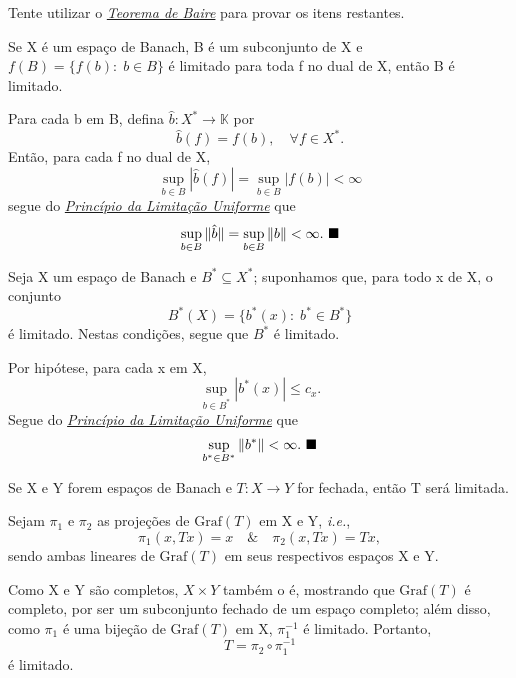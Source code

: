 \documentclass[../functional_analysis.tex]{subfiles}
\begin{document}
\begin{exr}
	Tente utilizar o \hyperlink{baire_theorem}{\textit{Teorema de Baire}} para provar os itens restantes.
\end{exr}
\begin{crl*}
	Se X é um espaço de Banach, B é um subconjunto de X e \(f(B)=\{f(b):\; b\in B\}\) é limitado para toda f no dual de X, então B é limitado.
\end{crl*}
\begin{proof*}
	Para cada b em B, defina \(\hat{b}:X^{*}\rightarrow \mathbb{K}\) por
	\[
		\hat{b}(f)=f(b),\quad \forall f\in X^{*}.
	\]
	Então, para cada f no dual de X,
	\[
		\sup_{b\in B}| \hat{b}(f) | = \sup_{b\in B}| f(b) | < \infty
	\]
	segue do \hyperlink{uniform_limitation}{\textit{Princípio da Limitação Uniforme}} que
	\[
		\sup_{b\in B} \Vert \hat{b} \Vert = \sup_{b\in B}\Vert b \Vert < \infty. \text{ $\blacksquare$}
	\]
\end{proof*}
\begin{crl*}
	Seja X um espaço de Banach e \(B^{*}\subseteq X^{*}\); suponhamos que, para todo x de X, o conjunto
	\[
		B^{*}(X)=\{b^{*}(x):\; b^{*}\in B^{*}\}
	\]
	é limitado. Nestas condições, segue que \(B^{*}\) é limitado.
\end{crl*}
\begin{proof*}
	Por hipótese, para cada x em X,
	\[
		\sup_{b\in B^{*}} | b^{*}(x) | \leq c_{x}.
	\]
	Segue do \hyperlink{uniform_limitation}{\textit{Princípio da Limitação Uniforme}} que
	\[
		\sup_{b^{*}\in B^{*}}\Vert b^{*} \Vert<\infty. \text{ $\blacksquare$}
	\]
\end{proof*}

\hypertarget{closed_graphic}{
	\begin{theorem*}
		Se X e Y forem espaços de Banach e \(T:X\rightarrow Y\) for fechada, então T será limitada.
	\end{theorem*}
}
\begin{proof*}
	Sejam \(\pi_1\) e \(\pi_2\) as projeções de \(\mathrm{Graf}(T)\) em X e Y, \textit{i.e.},
	\[
		\pi_1(x, Tx) = x \quad\&\quad \pi_2(x, Tx) = Tx,
	\]
	sendo ambas lineares de \(\mathrm{Graf}(T)\) em seus respectivos espaços X e Y.

	Como X e Y são completos, \(X\times Y\) também o é, mostrando que \(\mathrm{Graf}(T)\) é completo, por ser um subconjunto fechado de um espaço completo; além disso, como \(\pi_1\) é uma bijeção de \(\mathrm{Graf}(T)\) em X, \(\pi_{1}^{-1}\) é limitado. Portanto,
	\[
		T = \pi_2 \circ \pi_{1}^{-1}
	\]
	é limitado. \qedsymbol
\end{proof*}
\end{document}

